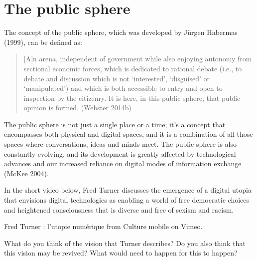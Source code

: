 \documentclass[
  letterpaper,
  DIV=11,
  numbers=noendperiod]{scrreprt}
\begin{document}
\section{The public sphere}\label{the-public-sphere}

The concept of the public sphere, which was developed by Jürgen Habermas
(1999), can be defined as:

\begin{quote}
{[}A{]}n arena, independent of government while also enjoying autonomy
from sectional economic forces, which is dedicated to rational debate
(i.e., to debate and discussion which is not `interested', `disguised'
or `manipulated') and which is both accessible to entry and open to
inspection by the citizenry. It is here, in this public sphere, that
public opinion is formed. (Webster 2014b)
\end{quote}

The public sphere is not just a single place or a time; it's a concept
that encompasses both physical and digital spaces, and it is a
combination of all those spaces where conversations, ideas and minds
meet. The public sphere is also constantly evolving, and its development
is greatly affected by technological advances and our increased reliance
on digital modes of information exchange (McKee 2004).

In the short video below, Fred Turner discusses the emergence of a
digital utopia that envisions digital technologies as enabling a world
of free democratic choices and heightened consciousness that is diverse
and free of sexism and racism.

Fred Turner : l'utopie numérique from Culture mobile on Vimeo.

\begin{tcolorbox}[enhanced jigsaw, arc=.35mm, bottomrule=.15mm, bottomtitle=1mm, breakable, colback=white, colbacktitle=quarto-callout-tip-color!10!white, colframe=quarto-callout-tip-color-frame, coltitle=black, left=2mm, leftrule=.75mm, opacityback=0, opacitybacktitle=0.6, rightrule=.15mm, title=\textcolor{quarto-callout-tip-color}{\faLightbulb}\hspace{0.5em}{Stop and reflect}, titlerule=0mm, toprule=.15mm, toptitle=1mm]

What do you think of the vision that Turner describes? Do you also think
that this vision may be revived? What would need to happen for this to
happen?

\end{tcolorbox}
\end{document}
